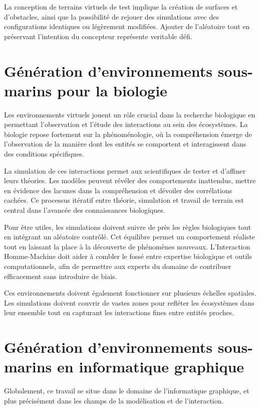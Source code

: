 La conception de terrains virtuels de test implique la création de surfaces et d'obstacles, ainsi que la possibilité de rejouer des simulations avec des configurations identiques ou légèrement modifiées. Ajouter de l'aléatoire tout en préservant l'intention du concepteur représente veritable défi.

\section*{Génération d'environnements sous-marins pour la biologie}

Les environnements virtuels jouent un rôle crucial dans la recherche biologique en permettant l'observation et l'étude des interactions au sein des écosystèmes. La biologie repose fortement sur la phénoménologie, où la compréhension émerge de l'observation de la manière dont les entités se comportent et interagissent dans des conditions spécifiques.

La simulation de ces interactions permet aux scientifiques de tester et d'affiner leurs théories. Les modèles peuvent révéler des comportements inattendus, mettre en évidence des lacunes dans la compréhension et dévoiler des corrélations cachées. Ce processus itératif entre théorie, simulation et travail de terrain est central dans l'avancée des connaissances biologiques.

Pour être utiles, les simulations doivent suivre de près les règles biologiques tout en intégrant un aléatoire contrôlé. Cet équilibre permet un comportement réaliste tout en laissant la place à la découverte de phénomènes nouveaux. L'Interaction Homme-Machine doit aider à combler le fossé entre expertise biologique et outils computationnels, afin de permettre aux experts du domaine de contribuer efficacement sans introduire de biais.

Ces environnements doivent également fonctionner sur plusieurs échelles spatiales. Les simulations doivent couvrir de vastes zones pour refléter les écosystèmes dans leur ensemble tout en capturant les interactions fines entre entités proches.

\section*{Génération d'environnements sous-marins en informatique graphique}

Globalement, ce travail se situe dans le domaine de l'informatique graphique, et plus précisément dans les champs de la modélisation et de l'interaction.

